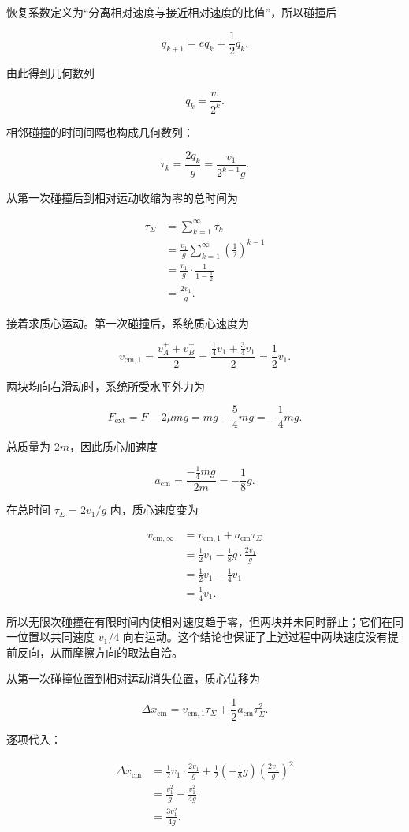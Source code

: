 \documentclass[12pt,a4paper,UTF8]{ctexart}
\begin{document}
恢复系数定义为``分离相对速度与接近相对速度的比值''，所以碰撞后

\[q_{k+1}=e q_k=\frac12q_k.\]

由此得到几何数列

\[q_k=\frac{v_1}{2^k}.\]

相邻碰撞的时间间隔也构成几何数列：

\[\tau_k=\frac{2q_k}{g}
=\frac{v_1}{2^{k-1}g}.\]

从第一次碰撞后到相对运动收缩为零的总时间为

\[\begin{aligned}
\tau_\Sigma
&=\sum_{k=1}^{\infty}\tau_k\\
&=\frac{v_1}{g}
\sum_{k=1}^{\infty}\left(\frac12\right)^{k-1}\\
&=\frac{v_1}{g}\cdot\frac{1}{1-\frac12}\\
&=\frac{2v_1}{g}.
\end{aligned}\]

接着求质心运动。第一次碰撞后，系统质心速度为

\[v_{\mathrm{cm},1}
=\frac{v_A^++v_B^+}{2}
=\frac{\frac14v_1+\frac34v_1}{2}
=\frac12v_1.\]

两块均向右滑动时，系统所受水平外力为

\[F_{\mathrm{ext}}
=F-2\mu mg
=mg-\frac54mg
=-\frac14mg.\]

总质量为 \(2m\)，因此质心加速度

\[a_{\mathrm{cm}}
=\frac{-\frac14mg}{2m}
=-\frac18g.\]

在总时间 \(\tau_\Sigma=2v_1/g\) 内，质心速度变为

\[\begin{aligned}
v_{\mathrm{cm},\infty}
&=v_{\mathrm{cm},1}+a_{\mathrm{cm}}\tau_\Sigma\\
&=\frac12v_1-\frac18g\cdot\frac{2v_1}{g}\\
&=\frac12v_1-\frac14v_1\\
&=\frac14v_1.
\end{aligned}\]

所以无限次碰撞在有限时间内使相对速度趋于零，但两块并未同时静止；它们在同一位置以共同速度
\(v_1/4\)
向右运动。这个结论也保证了上述过程中两块速度没有提前反向，从而摩擦方向的取法自洽。

从第一次碰撞位置到相对运动消失位置，质心位移为

\[\Delta x_{\mathrm{cm}}
=v_{\mathrm{cm},1}\tau_\Sigma
+\frac12a_{\mathrm{cm}}\tau_\Sigma^2.\]

逐项代入：

\[\begin{aligned}
\Delta x_{\mathrm{cm}}
&=\frac12v_1\cdot\frac{2v_1}{g}
+\frac12\left(-\frac18g\right)
\left(\frac{2v_1}{g}\right)^2\\
&=\frac{v_1^2}{g}
-\frac{v_1^2}{4g}\\
&=\frac{3v_1^2}{4g}.
\end{aligned}\]
\end{document}
